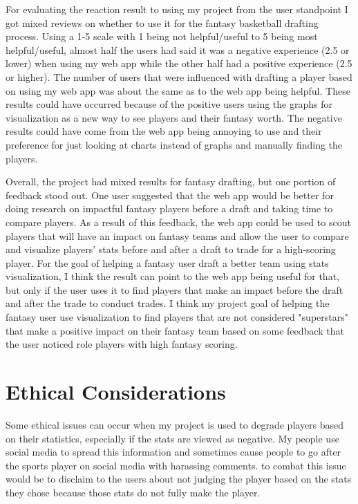 \documentclass[10pt,twocolumn]{article}
\begin{document}
For evaluating the reaction result to using my project from the user standpoint I got mixed reviews on whether to use it for the fantasy basketball drafting process. Using a 1-5 scale with 1 being not helpful/useful to 5 being most helpful/useful, almost half the users had said it was a negative experience (2.5 or lower) when using my web app while the other half had a positive experience (2.5 or higher). The number of users that were influenced with drafting a player based on using my web app was about the same as to the web app being helpful. These results could have occurred because of the positive users using the graphs for visualization as a new way to see players and their fantasy worth. The negative results could have come from the web app being annoying to use and their preference for just looking at charts instead of graphs and manually finding the players. 

Overall, the project had mixed results for fantasy drafting, but one portion of feedback stood out. One user suggested that the web app would be better for doing research on impactful fantasy players before a draft and taking time to compare players. As a result of this feedback, the web app could be used to scout players that will have an impact on fantasy teams and allow the user to compare and visualize players' stats before and after a draft to trade for a high-scoring player. For the goal of helping a fantasy user draft a better team using stats visualization, I think the result can point to the web app being useful for that, but only if the user uses it to find players that make an impact before the draft and after the trade to conduct trades. I think my project goal of helping the fantasy user use visualization to find players that are not considered "superstars" that make a positive impact on their fantasy team based on some feedback that the user noticed role players with high fantasy scoring.  

\section{Ethical Considerations}
Some ethical issues can occur when my project is used to degrade players based on their statistics, especially if the stats are viewed as negative. My people use social media to spread this information and sometimes cause people to go after the sports player on social media with harassing comments. to combat this issue would be to disclaim to the users about not judging the player based on the stats they chose because those stats do not fully make the player. 
\end{document}
